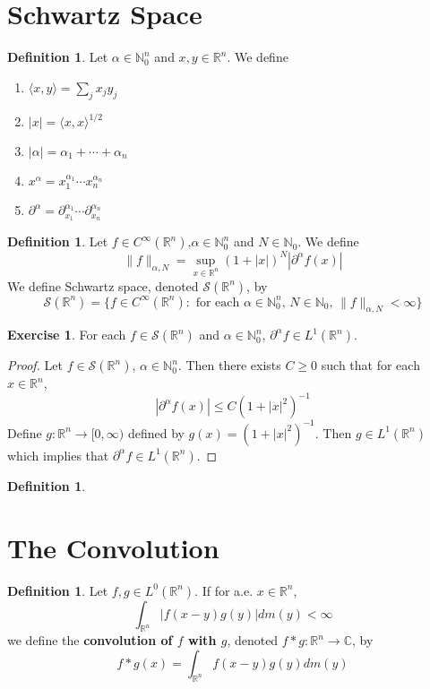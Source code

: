 \documentclass{book}
\theoremstyle{definition}
\newtheorem{defn}[definition]{Definition}
\newtheorem{ex}[definition]{Exercise}
\newcommand{\al}{\alpha}
\newcommand{\C}{\mathbb{C}}
\newcommand{\N}{\mathbb{N}}
\newcommand{\R}{\mathbb{R}}
\newcommand{\MS}{\mathcal{S}}
\newcommand{\lex}[1]{\label{ex:#1}}
\newcommand{\ld}[1]{\label{defn:#1}}
\DeclareMathOperator*{\0}{\mbf{0}}
\DeclareMathOperator*{\1}{\mbf{1}}
\renewcommand{\r}{\rangle}
\renewcommand{\l}{\langle}
\newcommand{\p}{\partial}
\newcommand{\Rg}{[0,\infty)}
\begin{document}
	\section{Schwartz Space}
	\begin{defn}
	\ld{100} Let $\al \in \N_0^n$ and $x, y \in \R^n$. We define 
	\begin{enumerate}
	\item $\l x , y\r  = \sum_{j}x_jy_j$
	\item $|x| = \l x, x\r^{1/2}$
	\item $|\al| = \al_1 + \cdots + \al_n$
	\item $x^\al = x_1^{\al_1}\cdots x_n^{\al_n}$
	\item $\p^{\al} = \p_{x_1}^{\al_1} \cdots \p_{x_n}^{\al_n}$
	\end{enumerate}
	\end{defn}	
	
	\begin{defn}
	\ld{101} Let $f \in C^{\infty}(\R^n)$,$\al \in \N_0^n$ and $N \in \N_0$. We define $$\|f\|_{\al, N} = \sup_{x \in \R^n} (1 + |x|)^N |\p^{\al}f (x) |$$
	We define Schwartz space, denoted $\MS(\R^n)$, by $$\MS(\R^n) = \{f \in C^{\infty}(\R^n): \text{ for each $\al \in \N_0^n$, $N \in \N_0$, } \|f\|_{\al, N} < \infty\}$$
	\end{defn}
	
	\begin{ex}
	\lex{102} For each $f \in \MS(\R^n)$ and $\al \in \N_0^n$, $\p^\al f \in L^1(\R^n)$.
	\end{ex}
	
	\begin{proof}
	Let $f \in \MS(\R^n)$, $\al \in \N_0^n$. Then there exists $C \geq 0$ such that for each $x \in \R^n$, $$| \p^{\al} f(x)| \leq C(1+|x|^{2})^{-1}$$
	Define $g:\R^n \rightarrow \Rg$ defined by $g(x) = (1+|x|^{2})^{-1}$. Then $g \in L^1(\R^n)$ which implies that $\p^{\al} f \in L^1(\R^n)$.
	\end{proof}
	
	\begin{defn}
	
	\end{defn}
	
	
	
	
	
	
	
	
	
	
	
	\newpage
	\section{The Convolution}
	\begin{defn}
	\ld{200}Let $f, g \in L^0(\R^n)$. If for a.e. $x \in \R^n$, $$\int_{\R^n} |f(x-y)g(y)| dm(y) < \infty$$  
	we define the \textbf{convolution of $f$ with $g$}, denoted $f * g: \R^n \rightarrow \C$, by $$ f * g(x) = \int_{\R^n} f(x-y)g(y) dm(y)$$
	\end{defn}
	
\end{document}
